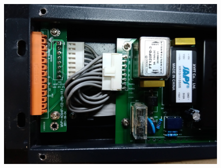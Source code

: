 \begin{figure}[ht]
	\centering
	\includegraphics[width=1\textwidth]{./Figures/displayController.jpg}
	\caption{}
	\label{fig:displayController}
\end{figure}

